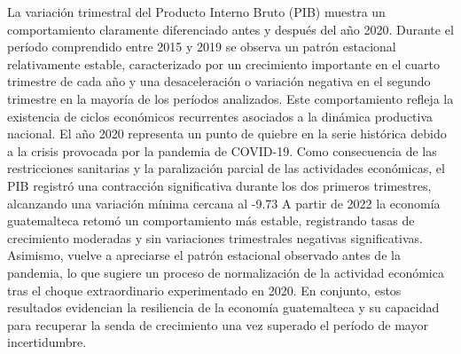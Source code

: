 La variación trimestral del Producto Interno Bruto (PIB) muestra un comportamiento claramente diferenciado antes y después del año 2020. Durante el período comprendido entre 2015 y 2019 se observa un patrón estacional relativamente estable, caracterizado por un crecimiento importante en el cuarto trimestre de cada año y una desaceleración o variación negativa en el segundo trimestre en la mayoría de los períodos analizados. Este comportamiento refleja la existencia de ciclos económicos recurrentes asociados a la dinámica productiva nacional.
El año 2020 representa un punto de quiebre en la serie histórica debido a la crisis provocada por la pandemia de COVID-19. Como consecuencia de las restricciones sanitarias y la paralización parcial de las actividades económicas, el PIB registró una contracción significativa durante los dos primeros trimestres, alcanzando una variación mínima cercana al -9.73%
A partir de 2022 la economía guatemalteca retomó un comportamiento más estable, registrando tasas de crecimiento moderadas y sin variaciones trimestrales negativas significativas. Asimismo, vuelve a apreciarse el patrón estacional observado antes de la pandemia, lo que sugiere un proceso de normalización de la actividad económica tras el choque extraordinario experimentado en 2020. En conjunto, estos resultados evidencian la resiliencia de la economía guatemalteca y su capacidad para recuperar la senda de crecimiento una vez superado el período de mayor incertidumbre.